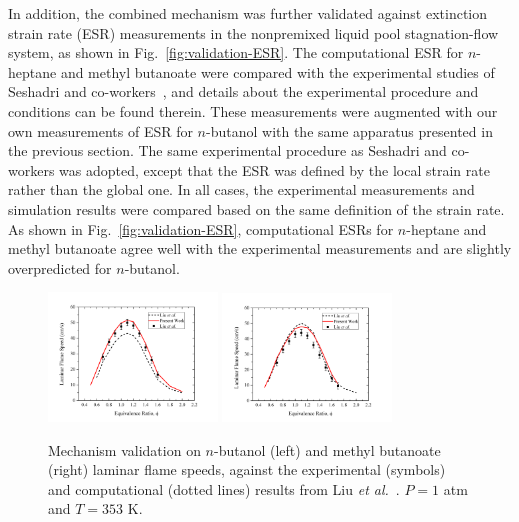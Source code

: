 \documentclass[review,3p,times]{elsarticleUS}
\begin{document}
In addition, the combined mechanism was further validated against extinction strain rate (ESR) measurements in the nonpremixed liquid pool stagnation-flow system, as shown in Fig.~\ref{fig:validation-ESR}.  The computational ESR for $n$-heptane and methyl butanoate were compared with the experimental studies of Seshadri and co-workers~\cite{seshadri08,niemann10}, and details about the experimental procedure and conditions can be found therein.  These measurements were augmented with our own measurements of ESR for $n$-butanol with the same apparatus presented in the previous section.  The same experimental procedure as Seshadri and co-workers was adopted, except that the ESR was defined by the local strain rate rather than the global one.  In all cases, the experimental measurements and simulation results were compared based on the same definition of the strain rate.  As shown in Fig.~\ref{fig:validation-ESR}, computational ESRs for $n$-heptane and methyl butanoate agree well with the experimental measurements and are slightly overpredicted for $n$-butanol.  

\begin{figure}[t]
  \centering
  \scriptsize
  \includegraphics[trim=4mm 8mm 30mm 20mm, clip=true, width=0.4\textwidth]{NB.png}
  \includegraphics[trim=4mm 8mm 30mm 20mm, clip=true, width=0.4\textwidth]{MB.png}
  \normalsize
  \vspace{-0.1in}
  \caption{Mechanism validation on $n$-butanol (left) and methyl butanoate (right) laminar flame speeds, against the experimental (symbols) and computational (dotted lines) results from Liu \emph{et al.}~\cite{liu11}. $P=1$ atm and $T=353$ K.}
  \label{fig:validation}
\end{figure}
\end{document}
